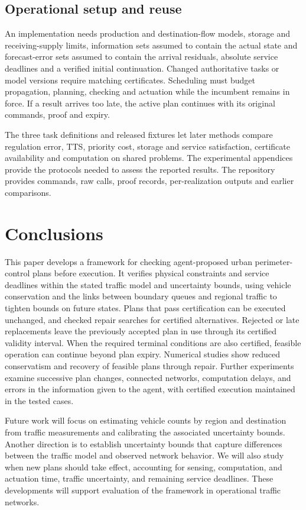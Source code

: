 \documentclass[preprint,12pt]{elsarticle}
\begin{document}
\subsection{Operational setup and reuse}

An implementation needs production and destination-flow models, storage and
receiving-supply limits, information sets assumed to contain the actual state and
forecast-error sets assumed to contain the arrival residuals, absolute
service deadlines and a verified initial continuation. Changed authoritative
tasks or model versions require matching certificates. Scheduling must budget
propagation, planning, checking and actuation while the incumbent remains in
force. If a result arrives too late, the active plan continues with its original
commands, proof and expiry.

The three task definitions and released fixtures let later methods compare
regulation error, TTS, priority cost, storage and service satisfaction,
certificate availability and computation on shared problems. The experimental
appendices provide the protocols needed to assess the reported results. The
repository provides commands, raw calls, proof records, per-realization outputs
and earlier comparisons.

\section{Conclusions}
\label{sec:new-conclusion}

This paper develops a framework for checking agent-proposed urban
perimeter-control plans before execution. It verifies physical constraints
and service deadlines within the stated traffic model and uncertainty
bounds, using vehicle conservation and the links between boundary queues and
regional traffic to tighten bounds on future states. Plans that pass
certification can be executed unchanged, and checked repair searches for
certified alternatives. Rejected or late replacements leave the previously
accepted plan in use through its certified validity interval. When the
required terminal conditions are also certified, feasible operation can
continue beyond plan expiry. Numerical studies show reduced conservatism and
recovery of feasible plans through repair. Further experiments examine
successive plan changes, connected networks, computation delays, and errors
in the information given to the agent, with certified execution maintained
in the tested cases.

Future work will focus on estimating vehicle counts by region and
destination from traffic measurements and calibrating the associated
uncertainty bounds. Another direction is to establish uncertainty bounds
that capture differences between the traffic model and observed network
behavior. We will also study when new plans should take effect, accounting
for sensing, computation, and actuation time, traffic uncertainty, and
remaining service deadlines. These developments will support evaluation of
the framework in operational traffic networks.
\end{document}
